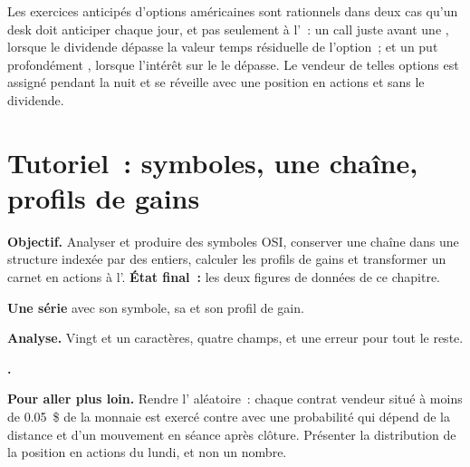 Les exercices anticipés d'options américaines sont rationnels dans deux cas qu'un desk
doit anticiper chaque jour, et pas seulement à l'~: un call juste avant une , lorsque le dividende dépasse la valeur temps résiduelle de l'option~; et un put
profondément , lorsque l'intérêt sur le  le dépasse. Le vendeur
de telles options est assigné pendant la nuit et se réveille avec une position en actions
et sans le dividende.

\section{Tutoriel~: symboles, une chaîne, profils de gains}\label{tut:m1:option-contracts-and-exchanges:chain}

\begin{tutorial}
\textbf{Objectif.} Analyser et produire des symboles OSI, conserver une chaîne dans une structure
indexée par des entiers, calculer les profils de gains et transformer un carnet en actions à l'.
\textbf{État final~:} les deux figures de données de ce chapitre.
\begin{tutsteps}
\item \textbf{Une série} avec son symbole, sa  et son profil de gain.
\label{lst:m1:option-contracts-and-exchanges:series}
\item \textbf{Analyse.} Vingt et un caractères, quatre champs, et une erreur pour
tout le reste.
\label{lst:m1:option-contracts-and-exchanges:parse}
\item \textbf{.}
\label{lst:m1:option-contracts-and-exchanges:expiry}
\end{tutsteps}
\textbf{Pour aller plus loin.} Rendre l' aléatoire~: chaque contrat vendeur situé à
moins de 0.05~\$ de la monnaie est exercé contre avec une probabilité qui dépend de la distance
et d'un mouvement en séance après clôture. Présenter la distribution de la position en actions
du lundi, et non un nombre.
\end{tutorial}

